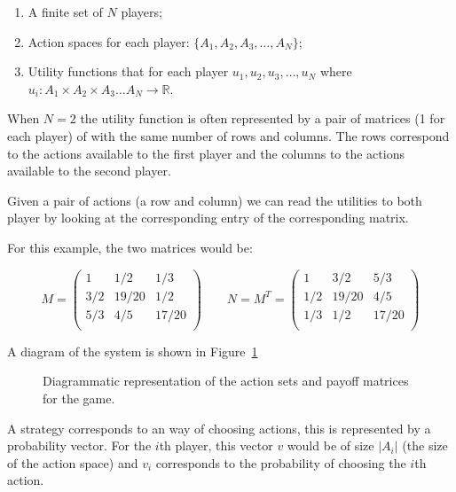 \begin{enumerate}
    \item A finite set of \(N\) players;
    \item Action spaces for each player: \(\{A_1, A_2, A_3, \dots, A_N\}\);
    \item Utility functions that for each player \(u_1, u_2, u_3, \dots, u_N\)
        where \(u_i:A_1\times A_2 \times A_3 \dots A_N \to \mathbb{R}\).
\end{enumerate}

When \(N=2\) the utility function is often represented by a pair of matrices (1
for each player) of with the same number of rows and columns. The rows
correspond to the actions available to the first player and the columns to the
actions available to the second player.

Given a pair of actions (a row and column) we can read the utilities to both
player by looking at the corresponding entry of the corresponding matrix.

For this example, the two matrices would be:

\[
   M =
        \begin{pmatrix}
            1     & 1 / 2   & 1 / 3 \\
            3 / 2 & 19 / 20 & 1 / 2 \\
            5 / 3 & 4 / 5   & 17 / 20\\
        \end{pmatrix}
   \qquad
   N = M ^T =
        \begin{pmatrix}
            1     & 3 / 2   & 5 / 3 \\
            1 / 2 & 19 / 20 & 4 / 5 \\
            1 / 3 & 1 / 2   & 17 / 20\\
        \end{pmatrix}
\]

A diagram of the system is shown in Figure~\ref{fig:taxi-firm-game}

\begin{figure}
\begin{center}

\end{center}
\caption{Diagrammatic representation of the action sets and payoff matrices for
    the game.}
\label{fig:taxi-firm-game}
\end{figure}

A strategy corresponds to an way of choosing actions, this is represented by a
probability vector. For the \(i\)th player, this vector \(v\) would be of size
\(|A_i|\) (the size of the action space) and \(v_i\) corresponds to the
probability of choosing the \(i\)th action.

